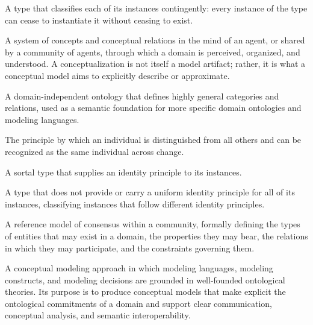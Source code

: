 
\begin{description}[style=nextline]

\item[Anti-Rigid Type] A type that classifies each of its instances contingently: every instance of the type can cease to instantiate it without ceasing to exist.

\item[Conceptualization] A system of concepts and conceptual relations in the mind of an agent, or shared by a community of agents, through which a domain is perceived, organized, and understood. A conceptualization is not itself a model artifact; rather, it is what a conceptual model aims to explicitly describe or approximate.

\item[Foundational Ontology] A domain-independent ontology that defines highly general categories and relations, used as a semantic foundation for more specific domain ontologies and modeling languages.

\item[Identity Principle] The principle by which an individual is distinguished from all others and can be recognized as the same individual across change.


\item[Identity Provider] A sortal type that supplies an identity principle to its instances.

\item[Non-Sortal Type] A type that does not provide or carry a uniform identity principle for all of its instances, classifying instances that follow different identity principles.

\item[Ontology] A reference model of consensus within a community, formally defining the types of entities that may exist in a domain, the properties they may bear, the relations in which they may participate, and the constraints governing them.

\item[Ontology-driven Conceptual Modeling] A conceptual modeling approach in which modeling languages, modeling constructs, and modeling decisions are grounded in well-founded ontological theories. Its purpose is to produce conceptual models that make explicit the ontological commitments of a domain and support clear communication, conceptual analysis, and semantic interoperability.


\end{description}
